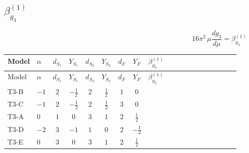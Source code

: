 \documentclass{article}
\begin{document}
\begin{landscape}
\section*{$\beta_{g_3}^{(1)}$}
\[16\pi^2\,\mu\frac{d g_3}{d\mu}=\beta_{g_3}^{(1)}\]
\tiny
\begin{longtable}{@{}llcccccc >{\raggedright\arraybackslash}p{0.54\linewidth}@{}}
\toprule
Model & $\alpha$ & $d_{S_1}$ & $Y_{S_1}$ & $d_{S_2}$ & $Y_{S_2}$ & $d_F$ & $Y_F$ & $\beta_{g_3}^{(1)}$ \\
\midrule
\endfirsthead
\toprule
Model & $\alpha$ & $d_{S_1}$ & $Y_{S_1}$ & $d_{S_2}$ & $Y_{S_2}$ & $d_F$ & $Y_F$ & $\beta_{g_3}^{(1)}$ \\
\midrule
\endhead
T3-B & $-1$ & $2$ & $-\frac{1}{2}$ & $2$ & $\frac{1}{2}$ & $1$ & $0$ & \scriptsize\adjustbox{max width=\linewidth}{$\begin{gathered} -7 {g_3}^3\end{gathered}$} \\
\midrule
T3-C & $-1$ & $2$ & $-\frac{1}{2}$ & $2$ & $\frac{1}{2}$ & $3$ & $0$ & \scriptsize\adjustbox{max width=\linewidth}{$\begin{gathered} -7 {g_3}^3\end{gathered}$} \\
\midrule
T3-A & $0$ & $1$ & $0$ & $3$ & $1$ & $2$ & $\frac{1}{2}$ & \scriptsize\adjustbox{max width=\linewidth}{$\begin{gathered} -7 {g_3}^3\end{gathered}$} \\
\midrule
T3-D & $-2$ & $3$ & $-1$ & $1$ & $0$ & $2$ & $-\frac{1}{2}$ & \scriptsize\adjustbox{max width=\linewidth}{$\begin{gathered} -7 {g_3}^3\end{gathered}$} \\
\midrule
T3-E & $0$ & $3$ & $0$ & $3$ & $1$ & $2$ & $\frac{1}{2}$ & \scriptsize\adjustbox{max width=\linewidth}{$\begin{gathered} -7 {g_3}^3\end{gathered}$} \\
\midrule
\bottomrule
\end{longtable}
\clearpage

\end{landscape}
\end{document}
